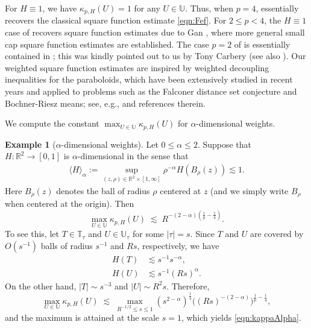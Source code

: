 \documentclass[11pt]{amsart}
\theoremstyle{definition}
\newtheorem{ex}{Example}
\theoremstyle{remark}
\newcommand{\R}{\mathbb{R}}
\newcommand{\T}{\mathbb{T}}
\newcommand{\U}{\mathbb{U}}
\newcommand{\les}{\lesssim}
\newcommand{\inn}[1]{\langle  #1 \rangle}
\begin{document}
For $H\equiv 1$, we have $\kappa_{p,H}(U)=1$ for any $U\in \U$. Thus, when $p=4$,   essentially recovers   the classical square function estimate \eqref{eqn:Fef}. For $2\leq p<4$, the $H\equiv 1$ case of   recovers  square function estimates due to Gan \cite{Gan}, where more general small cap square function estimates are established. The case $p=2$ of  is essentially contained in \cite{CarberySeeger}; this was kindly pointed out to us by Tony Carbery (see also \cite[pages 17--19]{CarberySlide}).
Our weighted square function estimates are inspired by weighted decoupling inequalities for the paraboloids, which have been extensively studied in recent years and applied to problems such as the Falconer distance set conjecture and Bochner-Riesz means; see, e.g., \cite{GIOW, DORZ, GanWu, Kim} and references therein. 

We compute the constant $\max_{U\in \U} \kappa_{p,H}(U)$ for $\alpha$-dimensional weights.
\begin{ex}[$\alpha$-dimensional weights]\label{ex_alpha}
	Let $0\leq \alpha \leq 2$. Suppose that $H:\R^2 \to [0,1]$ is  $\alpha$-dimensional in the sense that 
	\begin{align*}
		\inn{H}_\alpha:=\sup_{(z,\rho)\in \R^2 \times [1,\infty]} \rho^{-\alpha} H(B_\rho(z)) \les 1.
	\end{align*}
Here $B_\rho(z)$ denotes the ball of radius $\rho$ centered at $z$ (and we simply write $B_\rho$ when centered at the origin).
Then
	\begin{equation}\label{eqn:kappaAlpha}
		\max_{U\in \U} \kappa_{p,H}(U)
	\;\les\;  R^{-(2-\alpha)\left(\frac{1}{p}-\frac{1}{4}\right)}.
	\end{equation}
To see this, let  $T\in \T_\tau$ and $U\in \U_\tau$ for some $|\tau|=s$. Since $T$ and $U$ are covered by $O(s^{-1})$ balls of radius $s^{-1}$ and $Rs$, respectively, we have 
\begin{align*}
  H(T) &\lesssim s^{-1} s^{-\alpha},\\
  H(U) &\lesssim s^{-1} (Rs)^{\alpha}.
\end{align*}
On the other hand, $|T|\sim s^{-3}$ and $|U|\sim R^2 s$. Therefore,
	\begin{equation*}
		\max_{U\in \U} \kappa_{p,H}(U) 
		\;\les\; \max_{R^{-1/2}\le s\le1} (s^{2-\alpha})^{\frac 1 4} \big( (Rs)^{-(2-\alpha)}\big)^{\frac1 p - \frac 1 4},
	\end{equation*}
and the maximum is attained at the scale $s=1$, which yields \eqref{eqn:kappaAlpha}.
\end{ex}
\end{document}
